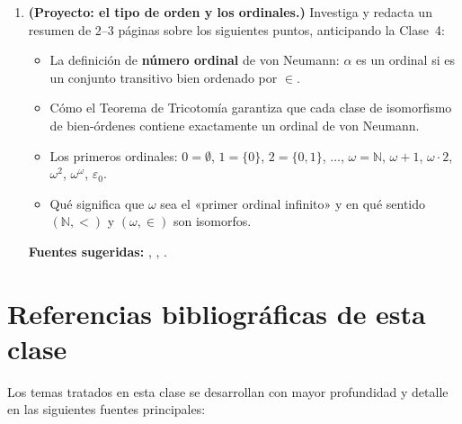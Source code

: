 \begin{enumerate}[leftmargin=2em, label=\textbf{\arabic*.}]
  \item \textbf{(Proyecto: el tipo de orden y los ordinales.)}
  Investiga y redacta un resumen de 2--3 páginas sobre los siguientes puntos, anticipando la Clase~4:
  \begin{itemize}[leftmargin=2em]
    \item La definición de \textbf{número ordinal} de von Neumann: $\alpha$ es un ordinal si es un conjunto transitivo bien ordenado por $\in$.
    \item Cómo el Teorema de Tricotomía garantiza que cada clase de isomorfismo de bien-órdenes contiene exactamente un ordinal de von Neumann.
    \item Los primeros ordinales: $0 = \emptyset$, $1 = \{0\}$, $2 = \{0,1\}$, $\ldots$, $\omega = \mathbb{N}$, $\omega+1$, $\omega \cdot 2$, $\omega^2$, $\omega^\omega$, $\varepsilon_0$.
    \item Qué significa que $\omega$ sea el «primer ordinal infinito» y en qué sentido $(\mathbb{N}, <)$ y $(\omega, \in)$ son isomorfos.
  \end{itemize}
  \textbf{Fuentes sugeridas:} \cite{jech2003}, \cite{kunen2011}, \cite{enderton1977}.

\end{enumerate}

\section*{Referencias bibliográficas de esta clase}

Los temas tratados en esta clase se desarrollan con mayor profundidad y detalle en las siguientes fuentes principales:

